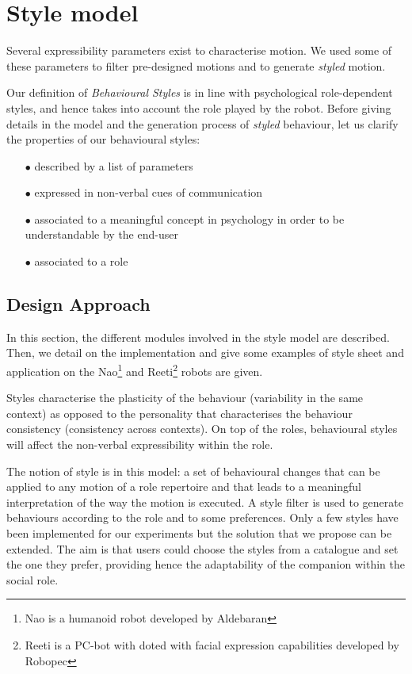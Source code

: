\section{Style model}
\label{sec:styles}
Several expressibility parameters exist to characterise motion. 
We used some of these parameters to filter pre-designed motions and to generate \textit{styled} motion.

Our definition of \emph{Behavioural Styles} is in line with psychological role-dependent styles, and hence takes into account the role played by the robot.
Before giving details in the model and the generation process of \textit{styled} behaviour, let us clarify the properties of our behavioural styles:
\begin{itemize}[noitemsep,nolistsep]
	\item[$\bullet$] described by a list of parameters
	\item[$\bullet$]  expressed in non-verbal cues of communication
	\item[$\bullet$]  associated to a meaningful concept in psychology in order to be understandable by the end-user
	\item[$\bullet$]  associated to a role
\end{itemize}


\subsection{Design Approach}
In this section, the different modules involved in the style model are described. 
Then, we detail on the implementation and give some examples of style sheet and application on the Nao\footnote{Nao is a humanoid robot developed by Aldebaran}  and Reeti\footnote{Reeti is a PC-bot with doted with facial expression capabilities developed by Robopec} robots are given.


Styles characterise the plasticity of the behaviour (variability in the same context) as opposed to the personality that characterises the behaviour consistency (consistency across contexts).
On top of the roles, behavioural styles will affect the non-verbal expressibility within the role.

The notion of style is in this model: a set of behavioural changes that can be applied to any motion of a role repertoire and that leads to a meaningful interpretation of the way the motion is executed. 
A style filter is used to generate behaviours according to the role and to some preferences. 
Only a few styles have been implemented for our experiments but the solution that we propose can be extended.
The aim is that users could choose the styles from a catalogue and set the one they prefer, providing hence the adaptability of the companion within the social role. 

